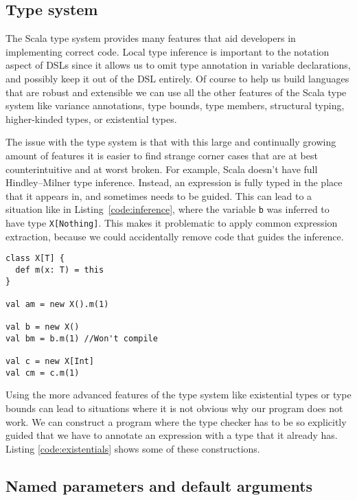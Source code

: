 \subsection{Type system}

The Scala type system provides many features that aid developers in implementing correct code.
Local type inference is important to the notation aspect of DSLs since it allows us to omit type annotation in variable declarations, and possibly keep it out of the DSL entirely.
Of course to help us build languages that are robust and extensible we can use all the other features of the Scala type system like variance annotations, type bounds, type members, structural typing, higher-kinded types, or existential types.

The issue with the type system is that with this large and continually growing amount of features it is easier to find strange corner cases that are at best counterintuitive and at worst broken.
For example, Scala doesn't have full Hindley–Milner type inference.
Instead, an expression is fully typed in the place that it appears in, and sometimes needs to be guided.
This can lead to a situation like in Listing~\ref{code:inference}, where the variable \texttt{b} was inferred to have type \texttt{X[Nothing]}.
This makes it problematic to apply common expression extraction, because we could accidentally remove code that guides the inference.

\begin{lstlisting}[caption=Local inference, label=code:inference, float]
class X[T] {
  def m(x: T) = this
}

val am = new X().m(1)

val b = new X()
val bm = b.m(1) //Won't compile

val c = new X[Int]
val cm = c.m(1)
\end{lstlisting}

Using the more advanced features of the type system like existential types or type bounds can lead to situations where it is not obvious why our program does not work.
We can construct a program where the type checker has to be so explicitly guided that we have to annotate an expression with a type that it already has.
Listing \ref{code:existentials} shows some of these constructions.

\subsection{Named parameters and default arguments}

